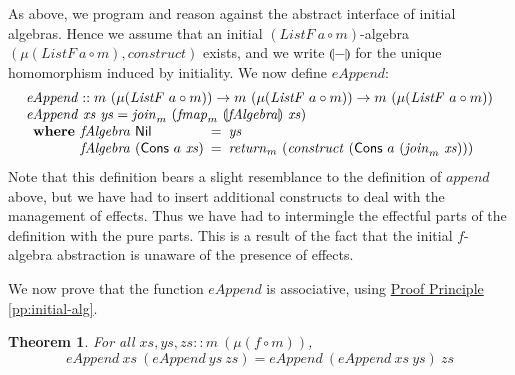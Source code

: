\documentclass{jfp1}
\newcommand{\fold}[1]{\llparenthesis #1 \rrparenthesis}
\newtheorem{theorem}{Theorem}
\newcommand{\proofprinref}[1]{\hyperref[#1]{Proof Principle \ref*{#1}}}
\begin{document}
As above, we program and reason against the abstract interface of
initial algebras. Hence we assume that an initial $(\mathit{ListF}~a
\circ m)$-algebra $(\mu(\mathit{ListF}~a \circ m),
\mathit{construct})$ exists, and we write $\fold{-}$ for the unique
homomorphism induced by initiality. We now define $\mathit{eAppend}$:
\begin{displaymath}
  \begin{array}{l}
    \mathit{eAppend} :: m~(\mu (\mathit{ListF}~a \circ m)) \to m~(\mu (\mathit{ListF}~a \circ m)) \to m~(\mu (\mathit{ListF}~a \circ m)) \\
    \mathit{eAppend}~\mathit{xs}~\mathit{ys} = \mathit{join}_m~(\mathit{fmap}_m~\fold{\mathit{fAlgebra}}~\mathit{xs}) \\
    \begin{array}{r@{\hspace{0.4em}}l@{\hspace{0.5em}}c@{\hspace{0.5em}}l}
      \textbf{where} & \mathit{fAlgebra}~\mathsf{Nil} &=& \mathit{ys} \\
                     & \mathit{fAlgebra}~(\mathsf{Cons}~a~\mathit{xs}) &=& \mathit{return}_m~(\mathit{construct}~(\mathsf{Cons}~a~(\mathit{join}_m~\mathit{xs})))
    \end{array}
  \end{array}
\end{displaymath}
Note that this definition bears a slight resemblance to the definition
of $\mathit{append}$ above, but we have had to insert additional
constructs to deal with the management of effects. Thus we have had to
intermingle the effectful parts of the definition with the pure
parts. This is a result of the fact that the initial $f$-algebra
abstraction is unaware of the presence of effects.

We now prove that the function $\mathit{eAppend}$ is associative,
using \proofprinref{pp:initial-alg}.

\begin{theorem}\label{thm:direct-eappend-assoc}
  For all $\mathit{xs}, \mathit{ys}, \mathit{zs} :: m~(\mu (f \circ m))$,
  \begin{displaymath}
    \mathit{eAppend}~\mathit{xs}~(\mathit{eAppend}~\mathit{ys}~\mathit{zs}) = \mathit{eAppend}~(\mathit{eAppend}~\mathit{xs}~\mathit{ys})~\mathit{zs}
  \end{displaymath}
\end{theorem}
\end{document}
